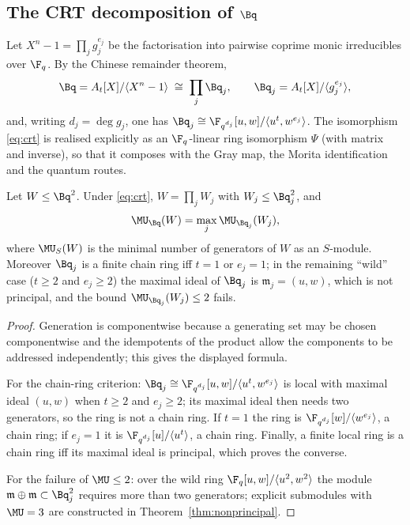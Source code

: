 \subsection{The CRT decomposition of \texorpdfstring{$\Bq$}{B}}%
\label{subsec:crt}

Let $X^n-1=\prod_{j}g_j^{e_j}$ be the factorisation into pairwise coprime
monic irreducibles over $\F_q$. By the Chinese remainder theorem,
\begin{equation}\label{eq:crt}
  \Bq=A_t[X]/\langle X^n-1\rangle
  \;\cong\;\prod_j \Bq_j,\qquad
  \Bq_j=A_t[X]/\langle g_j^{e_j}\rangle ,
\end{equation}
and, writing $d_j=\deg g_j$, one has $\Bq_j\cong\F_{q^{d_j}}[u,w]/\langle u^t,w^{e_j}\rangle$.
The isomorphism \eqref{eq:crt} is realised explicitly as an $\F_q$-linear ring
isomorphism $\Psi$ (with matrix and inverse), so that it composes with the Gray
map, the Morita identification and the quantum routes.

\begin{lemma}\label{lem:components}
Let $W\le \Bq^2$. Under \eqref{eq:crt}, $W=\prod_jW_j$ with
$W_j\le\Bq_j^2$, and
\[
  \MU_{\Bq}(W)=\max_j\MU_{\Bq_j}(W_j),
\]
where $\MU_S(W)$ is the minimal number of generators of $W$ as an
$S$-module. Moreover $\Bq_j$ is a finite chain ring iff $t=1$ or $e_j=1$; in
the remaining ``wild'' case ($t\ge2$ and $e_j\ge2$) the maximal ideal of
$\Bq_j$ is $\mathfrak m_j=(u,w)$, which is not principal, and the bound
$\MU_{\Bq_j}(W_j)\le2$ fails.
\end{lemma}

\begin{proof}
Generation is componentwise because a generating set may be chosen
componentwise and the idempotents of the product allow the components to be
addressed independently; this gives the displayed formula.

For the chain-ring criterion: $\Bq_j\cong\F_{q^{d_j}}[u,w]/\langle
u^t,w^{e_j}\rangle$ is local with maximal ideal $(u,w)$ when $t\ge2$ and
$e_j\ge2$; its maximal ideal then needs two generators, so the ring is not a
chain ring. If $t=1$ the ring is $\F_{q^{d_j}}[w]/\langle w^{e_j}\rangle$, a
chain ring; if $e_j=1$ it is $\F_{q^{d_j}}[u]/\langle u^t\rangle$, a chain
ring. Finally, a finite local ring is a chain ring iff its maximal ideal is
principal, which proves the converse.

For the failure of $\MU\le2$: over the wild ring
$\F_q[u,w]/\langle u^2,w^2\rangle$ the module $\mathfrak m\oplus\mathfrak
m\subset \Bq_j^2$ requires more than two generators; explicit submodules
with $\MU=3$ are constructed in Theorem~\ref{thm:nonprincipal}.
\end{proof}

